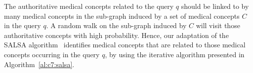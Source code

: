 \documentclass[1p]{elsarticle}
\begin{document}
% 
The authoritative medical concepts related to the query $q$ should be linked to by many medical concepts in the sub-graph induced by a set of medical concepts $C$ in the query $q$. A random walk on the sub-graph induced by $C$ will visit those authoritative concepts with high probability. Hence, our adaptation of the SALSA algorithm~\cite{lempel2001tois} identifies medical concepts that are related to those medical concepts occurring in the query $q$, by using the iterative algorithm presented in Algorithm~\ref{al:c7:salsa}.
\end{document}
